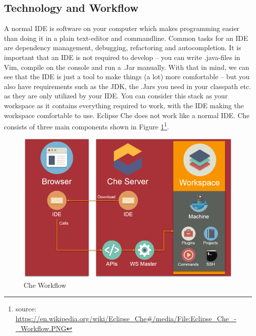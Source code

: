 \documentclass[utf8]{lni}
\begin{document}
\subsection{Technology and Workflow}
\label{subsec:Tec}
A normal IDE is software on your computer which makes programming easier than doing it in a plain text-editor and commandline. 
Common tasks for an IDE are dependency management, debugging, refactoring and autocompletion.
It is important that an IDE is not required to develop – you can write .java-files in Vim, compile on the console and run a .Jar manually. 
With that in mind, we can see that the IDE is just a tool to make things (a lot) more comfortable – but you also have requirements such as the JDK, the .Jars you need in your classpath etc. as they are only utilized by your IDE.
You can consider this stack as your workspace as it contains everything required to work, with the IDE making the workspace comfortable to use.
Eclipse Che does not work like a normal IDE. 
Che consists of three main components shown in Figure \ref{fig:cheworkflow}\footnote{source: \url{https://en.wikipedia.org/wiki/Eclipse_Che#/media/File:Eclipse_Che_-_Workflow.PNG}}.

\begin{figure}[h]
	\centering
	\includegraphics[width=0.7\linewidth]{imgs/Che_Workflow}
	\caption[Che Workflow]{Che Workflow}
	\label{fig:cheworkflow}
\end{figure}
\end{document}
